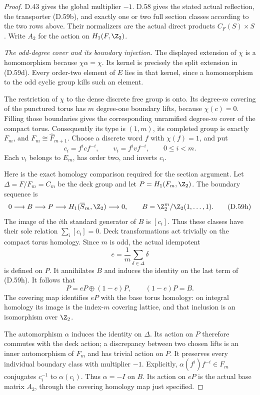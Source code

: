 \begin{proof}
D.43 gives the global multiplier $-1$.
D.58 gives the stated actual reflection, the
transporter (D.59b), and exactly one or two full
section classes according to the two rows above.
Their normalizers are the actual direct products
$C_F(S)\times S$.
Write $A_2$ for the action on $H_1(F,\Z_2)$.

\emph{The odd-degree cover and its boundary injection.}
The displayed extension of $\chi$ is a homomorphism
because $\chi\alpha=\chi$.
Its kernel is precisely the split extension in
(D.59d). Every order-two element of $E$ lies in
that kernel, since a homomorphism to the odd cyclic
group kills such an element.

The restriction of $\chi$ to the dense discrete
free group is onto. Its degree-$m$ covering of
the punctured torus has $m$ degree-one boundary
lifts, because $\chi(c)=0$.
Filling those boundaries gives the corresponding
unramified degree-$m$ cover of the compact torus.
Consequently its type is $(1,m)$, its completed
group is exactly $F_m$, and
$F_m\cong\widehat F_{m+1}$.
Choose a discrete word $f$ with $\chi(f)=1$, and put
\[
 c_i=f^icf^{-i},\qquad
 v_i=f^ivf^{-i},\qquad 0\leq i<m .
                                                        \tag{D.59g}
\]
Each $v_i$ belongs to $E_m$, has order two, and
inverts $c_i$.

Here is the exact homology comparison required
for the section argument.
Let $\Delta=F/F_m=C_m$ be the deck group and let
$P=H_1(F_m,\Z_2)$. The boundary sequence is
\[
 0\longrightarrow B\longrightarrow P
       \longrightarrow H_1(\overline S_m,\Z_2)
       \longrightarrow0,\qquad
 B=\Z_2^m/\Z_2(1,\ldots,1).
                                                        \tag{D.59h}
\]
The image of the $i$th standard generator of $B$
is $[c_i]$. Thus these classes have their sole
relation $\sum_i[c_i]=0$.
Deck transformations act trivially on the compact
torus homology. Since $m$ is odd, the actual
idempotent
\[
                    e=\frac1m\sum_{\delta\in\Delta}\delta
                                                        \tag{D.59i}
\]
is defined on $P$. It annihilates $B$ and induces
the identity on the last term of (D.59h).
It follows that
\[
             P=eP\oplus(1-e)P,\qquad (1-e)P=B .
                                                        \tag{D.59j}
\]
The covering map identifies $eP$ with the base
torus homology: on integral homology its image
is the index-$m$ covering lattice, and that
inclusion is an isomorphism over $\Z_2$.

The automorphism $\alpha$ induces the identity
on $\Delta$. Its action on $P$ therefore commutes
with the deck action; a discrepancy between two
chosen lifts is an inner automorphism of $F_m$
and has trivial action on $P$.
It preserves every individual boundary class
with multiplier $-1$. Explicitly,
$\alpha(f^i)f^{-i}\in F_m$ conjugates $c_i^{-1}$
to $\alpha(c_i)$. Thus $\alpha=-I$ on $B$.
Its action on $eP$ is the actual base matrix $A_2$,
through the covering homology map just specified.


\end{proof}
